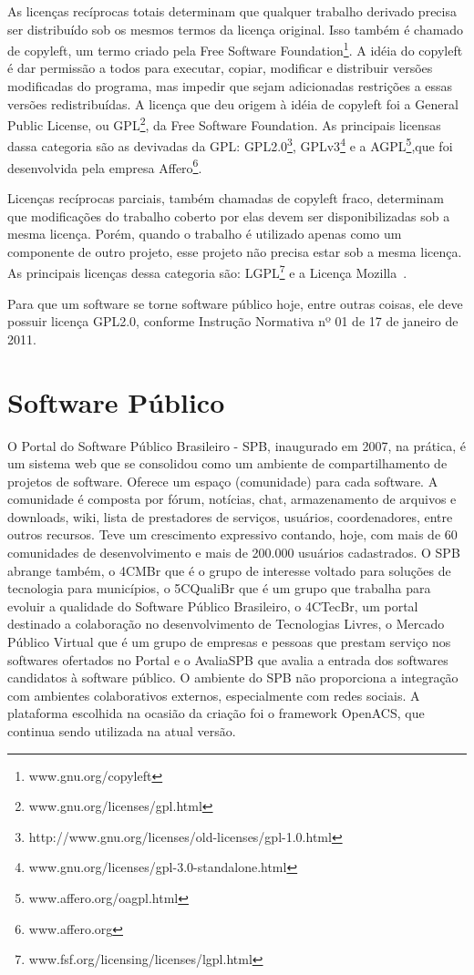 As licenças recíprocas totais determinam que qualquer trabalho derivado precisa 
ser distribuído sob os mesmos termos da licença original. Isso também é chamado de copyleft,
um termo criado pela Free Software Foundation\footnote{www.gnu.org/copyleft}. A idéia do
copyleft é dar permissão a todos para executar, copiar, modificar e distribuir versões
modificadas do programa, mas impedir que sejam adicionadas restrições a essas versões
redistribuídas. A licença que deu origem à idéia de copyleft foi a General Public 
License, ou GPL\footnote{www.gnu.org/licenses/gpl.html}, da Free Software Foundation.
As principais licensas dassa categoria são as devivadas da GPL: 
GPL2.0\footnote{http://www.gnu.org/licenses/old-licenses/gpl-1.0.html}, 
GPLv3\footnote{www.gnu.org/licenses/gpl-3.0-standalone.html} e a
AGPL\footnote{www.affero.org/oagpl.html},que foi desenvolvida pela empresa 
Affero\footnote{www.affero.org}.~\cite{sabino2009licenccas}

Licenças recíprocas parciais, também chamadas de copyleft fraco, determinam que
modificações do trabalho coberto por elas devem ser disponibilizadas sob a mesma 
licença. Porém, quando o trabalho é utilizado apenas como um componente de outro 
projeto, esse projeto não precisa estar sob a mesma licença. As principais licenças
dessa categoria são: LGPL\footnote{www.fsf.org/licensing/licenses/lgpl.html} e a
Licença Mozilla~\cite{sabino2009licenccas}.

Para que um software se torne software público hoje, entre outras coisas, ele deve
possuir licença GPL2.0, conforme Instrução Normativa nº 01 de 17 de janeiro de 2011.   

\section{Software Público}

O Portal do Software Público Brasileiro - SPB, inaugurado em 2007, na prática, é um sistema
web que se consolidou como um ambiente de compartilhamento de projetos de software. Oferece um
espaço (comunidade) para cada software. A comunidade é composta por fórum, notícias, chat, 
armazenamento de arquivos e downloads, wiki, lista de prestadores de serviços, usuários, coordenadores,
entre outros recursos. Teve um crescimento expressivo contando, hoje, com mais de 60 comunidades
de desenvolvimento e mais de 200.000 usuários cadastrados. O SPB abrange também, o 4CMBr que
é o grupo de interesse voltado para soluções de tecnologia para municípios, o 5CQualiBr que é um
grupo que trabalha para evoluir a qualidade do Software Público Brasileiro, o 4CTecBr, um portal
destinado a colaboração no desenvolvimento de Tecnologias Livres, o Mercado Público Virtual que
é um grupo de empresas e pessoas que prestam serviço nos softwares ofertados no Portal e o 
AvaliaSPB que avalia a entrada dos softwares candidatos à software público. O ambiente do SPB não
proporciona a integração com ambientes colaborativos externos, especialmente com redes sociais. A
plataforma escolhida na ocasião da criação foi o framework OpenACS, que continua sendo utilizada
na atual versão.

